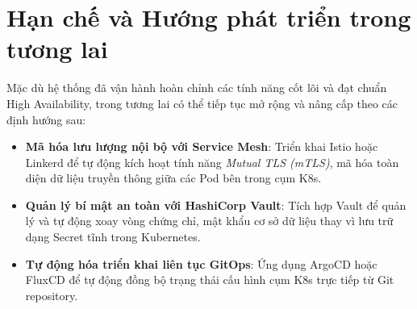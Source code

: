 \section{Hạn chế và Hướng phát triển trong tương lai}
Mặc dù hệ thống đã vận hành hoàn chỉnh các tính năng cốt lõi và đạt chuẩn High Availability, trong tương lai có thể tiếp tục mở rộng và nâng cấp theo các định hướng sau:

\begin{itemize}
    \item \textbf{Mã hóa lưu lượng nội bộ với Service Mesh}: Triển khai Istio hoặc Linkerd để tự động kích hoạt tính năng \textit{Mutual TLS (mTLS)}, mã hóa toàn diện dữ liệu truyền thông giữa các Pod bên trong cụm K8s.
    \item \textbf{Quản lý bí mật an toàn với HashiCorp Vault}: Tích hợp Vault để quản lý và tự động xoay vòng chứng chỉ, mật khẩu cơ sở dữ liệu thay vì lưu trữ dạng Secret tĩnh trong Kubernetes.
    \item \textbf{Tự động hóa triển khai liên tục GitOps}: Ứng dụng ArgoCD hoặc FluxCD để tự động đồng bộ trạng thái cấu hình cụm K8s trực tiếp từ Git repository.
\end{itemize}

